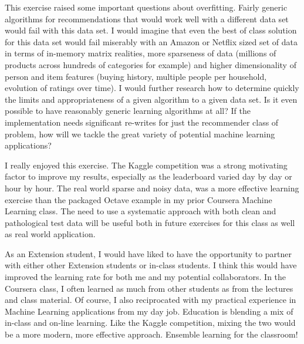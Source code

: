\documentclass[11pt, oneside]{article}   	%
\begin{document}
This exercise raised some important questions about overfitting. Fairly generic algorithms for recommendations that would work well with a different data set would fail with this data set. I would imagine that even the best of class solution for this data set would fail miserably with an Amazon or Netflix sized set of data in terms of in-memory matrix realities, more sparseness of data (millions of products across hundreds of categories for example) and higher dimensionality of person and item features (buying history, multiple people per household, evolution of ratings over time). I would further research how to determine quickly the limits and appropriateness of a given algorithm to a given data set. Is it even possible to have reasonably generic learning algorithms at all? If the implementation needs significant re-writes for just the recommender class of problem, how will we tackle the great variety of potential machine learning applications?

I really enjoyed this exercise. The Kaggle competition was a strong motivating factor to improve my results, especially as the leaderboard varied day by day or hour by hour. The real world sparse and noisy data, was a more effective learning exercise than the packaged Octave example in my prior Coursera Machine Learning class. The need to use a systematic approach with both clean and pathological test data will be useful both in future exercises for this class as well as real world application.

As an Extension student, I would have liked to have the opportunity to partner with either other Extension students or in-class students. I think this would have improved the learning rate for both me and my potential collaborators. In the Coursera class, I often learned as much from other students as from the lectures and class material. Of course, I also reciprocated with my practical experience in Machine Learning applications from my day job. Education is blending a mix of in-class and on-line learning. Like the Kaggle competition, mixing the two would be a more modern, more effective approach. Ensemble learning for the classroom!
\end{document}
